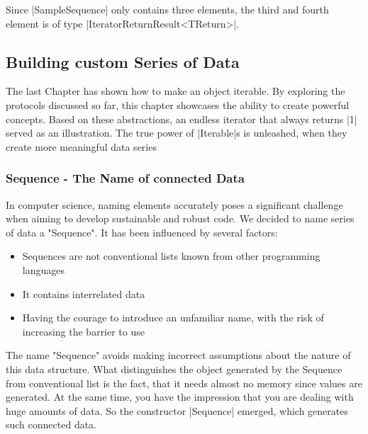 Since |SampleSequence| only contains three elements, the third
and fourth element is of type |IteratorReturnResult<TReturn>|.

\subsection{Building custom Series of Data}
\label{sub:Building custom Series of Data}
The last Chapter has shown how to make an object iterable. By exploring the 
protocols discussed so far, this chapter showcases the ability to create 
powerful concepts. Based on these abstractions, an endless iterator that always
returns |1| served as an illustration. The true power of |Iterable|s is 
unleashed, when they create more meaningful data series
\subsubsection{Sequence - The Name of connected Data}
\label{subsub:Sequence - The Name of connected Data}
In computer science, naming elements accurately poses a significant challenge 
when aiming to develop sustainable and robust code. We decided to name series
of data a "Sequence". It has been influenced by several factors:

\begin{itemize}
  \item{Sequences are not conventional lists known from other programming languages}
  \item{It contains interrelated data}
  \item{Having the courage to introduce an unfamiliar name, with the risk of increasing the barrier to use}
\end{itemize}

The name "Sequence" avoids making incorrect assumptions about the nature of
this data structure.
\newline
What distinguishes the object generated by the Sequence from conventional list
is the fact, that it needs almost no memory since values are generated. At the 
same time, you have the impression that you are dealing with huge amounts of data.
So the constructor |Sequence| emerged, which generates such connected data.

